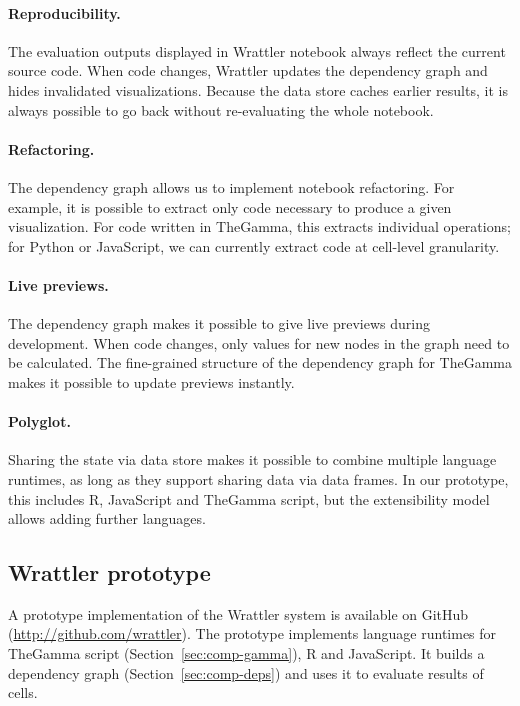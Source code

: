 \documentclass[sigplan]{acmart}\settopmatter{printfolios=true,printccs=false,printacmref=false}
\begin{document}
\paragraph{Reproducibility.} The evaluation outputs displayed in Wrattler notebook always reflect
the current source code. When code changes, Wrattler updates the dependency graph and hides 
invalidated visualizations. Because the data store caches earlier results, it is always possible
to go back without re-evaluating the whole notebook.

\paragraph{Refactoring.} The dependency graph allows us to implement notebook refactoring. 
For example, it is possible to extract only code necessary to produce a given visualization.
For code written in TheGamma, this extracts individual operations; for Python or JavaScript,
we can currently extract code at cell-level granularity.

\paragraph{Live previews.} The dependency graph makes it possible to give 
live previews during development. When code changes, only values for new nodes in the graph 
need to be calculated. The fine-grained structure of the dependency graph for TheGamma 
makes it possible to update previews instantly.

\paragraph{Polyglot.} Sharing the state via data store makes it possible to combine multiple
language runtimes, as long as they support sharing data via data frames. In our prototype, this
includes R, JavaScript and TheGamma script, but the extensibility model allows adding further
languages.

\subsection{Wrattler prototype}

A prototype implementation of the Wrattler system is available on GitHub (\url{http://github.com/wrattler}).
The prototype implements language runtimes for TheGamma script (Section~\ref{sec:comp-gamma}), R
and JavaScript. It builds a dependency graph (Section~\ref{sec:comp-deps})
and uses it to evaluate results of cells. 
\end{document}
